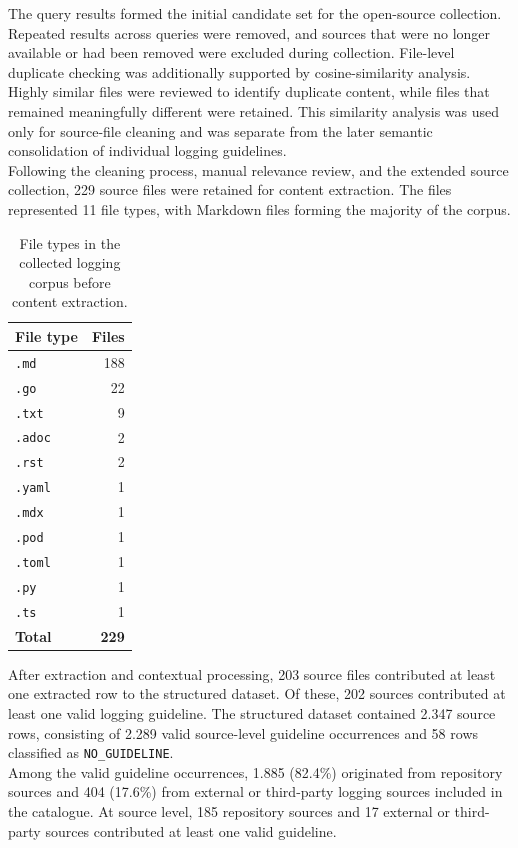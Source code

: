 The query results formed the initial candidate set for the open-source collection.
Repeated results across queries were removed, and sources that were no longer
available or had been removed were excluded during collection. File-level duplicate
checking was additionally supported by cosine-similarity analysis. Highly similar
files were reviewed to identify duplicate content, while files that remained
meaningfully different were retained. This similarity analysis was used only for
source-file cleaning and was separate from the later semantic consolidation of
individual logging guidelines.
\\
Following the cleaning process, manual relevance review, and the extended source
collection, 229 source files were retained for content extraction. The files
represented 11 file types, with Markdown files forming the majority of the corpus.

\begin{table}[H]
    \centering

    \begin{tabular}{lr}
        \toprule
        \textbf{File type} & \textbf{Files} \\
        \midrule
        \texttt{.md} & 188 \\
        \texttt{.go} & 22 \\
        \texttt{.txt} & 9 \\
        \texttt{.adoc} & 2 \\
        \texttt{.rst} & 2 \\
        \texttt{.yaml} & 1 \\
        \texttt{.mdx} & 1 \\
        \texttt{.pod} & 1 \\
        \texttt{.toml} & 1 \\
        \texttt{.py} & 1 \\
        \texttt{.ts} & 1 \\
        \midrule
        \textbf{Total} & \textbf{229} \\
        \bottomrule
    \end{tabular}

    \caption{File types in the collected logging corpus before content extraction.}
    \label{tab:oss-file-types}
\end{table}

After extraction and contextual processing, 203 source files contributed at least
one extracted row to the structured dataset. Of these, 202 sources contributed at
least one valid logging guideline. The structured dataset contained 2.347 source
rows, consisting of 2.289 valid source-level guideline occurrences and 58 rows
classified as \texttt{NO\_GUIDELINE}.
\\
Among the valid guideline occurrences, 1.885 (82.4\%) originated from repository
sources and 404 (17.6\%) from external or third-party logging sources included in
the catalogue. At source level, 185 repository sources and 17 external or third-party
sources contributed at least one valid guideline.

